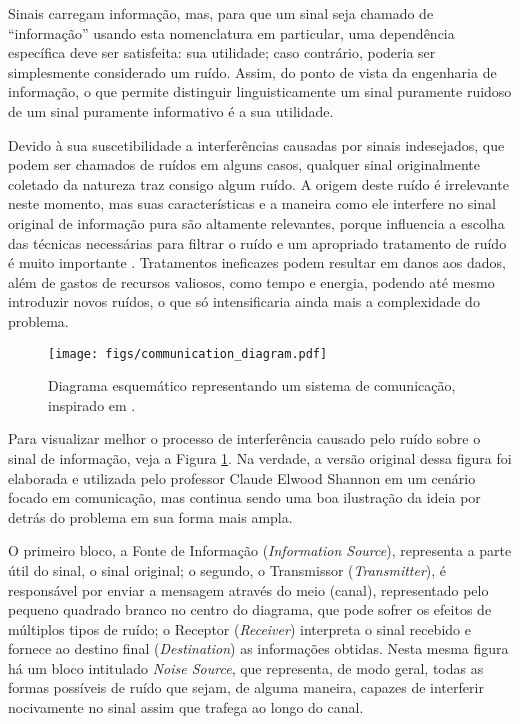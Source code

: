 Sinais carregam informação, mas, para que um sinal seja chamado de ``informação'' usando esta nomenclatura em particular, uma dependência específica deve ser satisfeita: sua utilidade; caso contrário, poderia ser simplesmente considerado um ruído. Assim, do ponto de vista da engenharia de informação, o que permite distinguir linguisticamente um sinal puramente ruidoso de um sinal puramente informativo é a sua utilidade.

Devido à sua suscetibilidade a interferências causadas por sinais indesejados, que podem ser chamados de ruídos em alguns casos, qualquer sinal originalmente coletado da natureza traz consigo algum ruído. A origem deste ruído é irrelevante neste momento, mas suas características e a maneira como ele interfere no sinal original de informação pura são altamente relevantes, porque influencia a escolha das técnicas necessárias para filtrar o ruído \citep{tuzlukov2002signal} e um apropriado tratamento de ruído é muito importante \citep{boll1979suppression, 382009, 1451965, 4766994}. Tratamentos ineficazes podem resultar em danos aos dados, além de gastos de recursos valiosos, como tempo e energia, podendo até mesmo introduzir novos ruídos, o que só intensificaria ainda mais a complexidade do problema.


\begin{figure}[H]
    \centering
    \texttt{[image: figs/communication\_diagram.pdf]}
    \caption{Diagrama esquemático representando um sistema de comunicação, inspirado em \citep{shannon1948mathematical}.}
    \label{fig:communication_diagram}
\end{figure}

Para visualizar melhor o processo de interferência causado pelo ruído sobre o sinal de informação, veja a Figura \ref{fig:communication_diagram}. Na verdade, a versão original dessa figura foi elaborada e utilizada pelo professor Claude Elwood Shannon em um cenário focado em comunicação, mas continua sendo uma boa ilustração da ideia por detrás do problema em sua forma mais ampla.

O primeiro bloco, a Fonte de Informação (\textit{Information Source}), representa a parte útil do sinal, o sinal original; o segundo, o Transmissor (\textit{Transmitter}), é responsável por enviar a mensagem através do meio (canal), representado pelo pequeno quadrado branco no centro do diagrama, que pode sofrer os efeitos de múltiplos tipos de ruído; o Receptor (\textit{Receiver}) interpreta o sinal recebido e fornece ao destino final (\textit{Destination}) as informações obtidas. Nesta mesma figura há um bloco intitulado \textit{Noise Source}, que representa, de modo geral, todas as formas possíveis de ruído que sejam, de alguma maneira, capazes de interferir nocivamente no sinal assim que trafega ao longo do canal.

